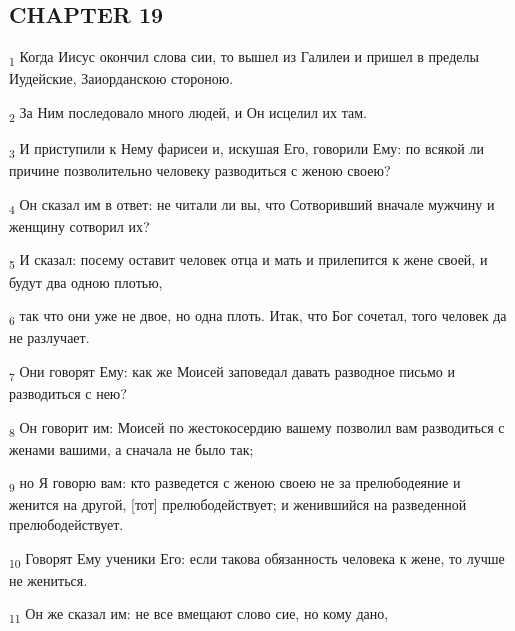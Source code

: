 \subsection{CHAPTER 19}
\begin{tcolorbox}
\textsubscript{1} Когда Иисус окончил слова сии, то вышел из Галилеи и пришел в пределы Иудейские, Заиорданскою стороною.
\end{tcolorbox}
\begin{tcolorbox}
\textsubscript{2} За Ним последовало много людей, и Он исцелил их там.
\end{tcolorbox}
\begin{tcolorbox}
\textsubscript{3} И приступили к Нему фарисеи и, искушая Его, говорили Ему: по всякой ли причине позволительно человеку разводиться с женою своею?
\end{tcolorbox}
\begin{tcolorbox}
\textsubscript{4} Он сказал им в ответ: не читали ли вы, что Сотворивший вначале мужчину и женщину сотворил их?
\end{tcolorbox}
\begin{tcolorbox}
\textsubscript{5} И сказал: посему оставит человек отца и мать и прилепится к жене своей, и будут два одною плотью,
\end{tcolorbox}
\begin{tcolorbox}
\textsubscript{6} так что они уже не двое, но одна плоть. Итак, что Бог сочетал, того человек да не разлучает.
\end{tcolorbox}
\begin{tcolorbox}
\textsubscript{7} Они говорят Ему: как же Моисей заповедал давать разводное письмо и разводиться с нею?
\end{tcolorbox}
\begin{tcolorbox}
\textsubscript{8} Он говорит им: Моисей по жестокосердию вашему позволил вам разводиться с женами вашими, а сначала не было так;
\end{tcolorbox}
\begin{tcolorbox}
\textsubscript{9} но Я говорю вам: кто разведется с женою своею не за прелюбодеяние и женится на другой, [тот] прелюбодействует; и женившийся на разведенной прелюбодействует.
\end{tcolorbox}
\begin{tcolorbox}
\textsubscript{10} Говорят Ему ученики Его: если такова обязанность человека к жене, то лучше не жениться.
\end{tcolorbox}
\begin{tcolorbox}
\textsubscript{11} Он же сказал им: не все вмещают слово сие, но кому дано,
\end{tcolorbox}
